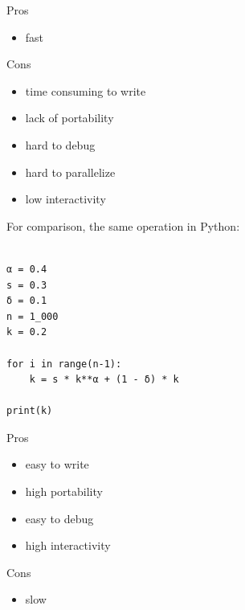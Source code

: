 \documentclass[
    xcolor={svgnames,dvipsnames},
    hyperref={colorlinks, citecolor=DeepPink4, linkcolor=DarkRed, urlcolor=DarkBlue}
    ]{beamer}  %
\newcommand{\1}{\mathbbm 1}
\begin{document}
\begin{frame}

    Pros

    \begin{itemize}
        \item fast 
    \end{itemize}


    \vspace{0.5em}

    Cons

    \begin{itemize}
        \item time consuming to write
        \item lack of portability
        \item hard to debug
        \item hard to parallelize
        \item low interactivity
    \end{itemize}

\end{frame}

\begin{frame}[fragile]


    For comparison, the same operation in Python:
    
    \begin{verbatim}

α = 0.4
s = 0.3
δ = 0.1
n = 1_000
k = 0.2

for i in range(n-1):
    k = s * k**α + (1 - δ) * k

print(k)

    \end{verbatim}

\end{frame}

\begin{frame}

    Pros

    \begin{itemize}
        \item easy to write
        \item high portability
        \item easy to debug
        \item high interactivity
    \end{itemize}

    \vspace{0.5em}

    Cons

    \begin{itemize}
        \item slow
    \end{itemize}

\end{frame}
\end{document}
